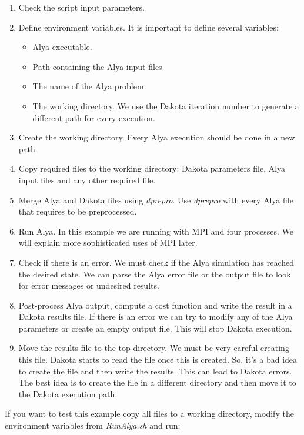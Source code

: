 \documentclass[12pt,a4paper,article]{memoir}
\begin{document}
\begin{enumerate}[label=Step \arabic*:,align=right,labelwidth=2.0cm,leftmargin=2.0cm]
\item Check the script input parameters.
\item Define environment variables. It is important to define several variables:
\begin{itemize}
\item Alya executable.
\item Path containing the Alya input files.
\item The name of the Alya problem.
\item The working directory. We use the Dakota iteration number to generate a different path for every execution.
\end{itemize}
\item Create the working directory. Every Alya execution should be done in a new path.
\item Copy required files to the working directory: Dakota parameters file, Alya input files and any other required file.
\item Merge Alya and Dakota files using \textit{dprepro}. Use \textit{dprepro} with every Alya file that requires to be preprocessed.
\item Run Alya. In this example we are running with MPI and four processes. We will explain more sophisticated uses of MPI later.
\item Check if there is an error. We must check if the Alya simulation has reached the desired state. We can parse the Alya error file or the output file to look for error messages or undesired results.
\item Post-process Alya output, compute a cost function and write the result in a Dakota results file. If there is an error we can try to modify any of the Alya parameters or create an empty output file. This will stop Dakota execution.
\item Move the results file to the top directory. We must be very careful creating this file. Dakota starts to read the file once this is created. So, it's a bad idea to create the file and then write the results. This can lead to Dakota errors. The best idea is to create the file in a different directory and then move it to the Dakota execution path.
\end{enumerate}

If you want to test this example copy all files to a working directory, modify the environment variables from \textit{RunAlya.sh} and run:
\end{document}
